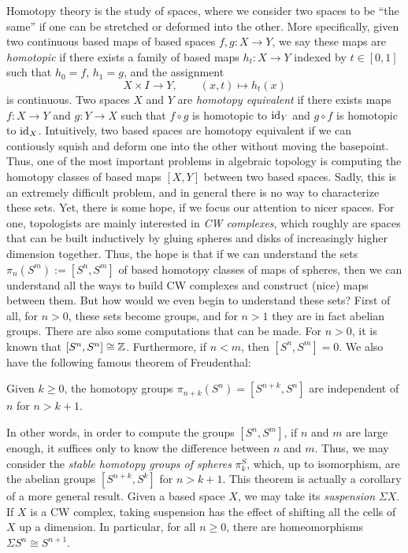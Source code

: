 \documentclass[../main.tex]{subfiles}
\begin{document}
Homotopy theory is the study of spaces, where we consider two spaces to be ``the same'' if one can be stretched or deformed into the other. More specifically, given two continuous based maps of based spaces $f,g:X\to Y$, we say these maps are \emph{homotopic} if there exists a family of based maps $h_t:X\to Y$ indexed by $t\in[0,1]$ such that $h_0=f$, $h_1=g$, and the assignment
\[X\times I\to Y,\qquad (x,t)\mapsto h_t(x)\]
is continuous. Two spaces $X$ and $Y$ are \emph{homotopy equivalent} if there exists maps $f:X\to Y$ and $g:Y\to X$ such that $f\circ g$ is homotopic to $\mathrm{id}_Y$ and $g\circ f$ is homotopic to $\mathrm{id}_X$. Intuitively, two based spaces are homotopy equivalent if we can contiously squish and deform one into the other without moving the basepoint. Thus, one of the most important problems in algebraic topology is computing the homotopy classes of based maps $[X,Y]$ between two based spaces. Sadly, this is an extremely difficult problem, and in general there is no way to characterize these sets. Yet, there is some hope, if we focus our attention to nicer spaces. For one, topologists are mainly interested in \emph{CW complexes}, which roughly are spaces that can be built inductively by gluing spheres and disks of increasingly higher dimension together. Thus, the hope is that if we can understand the sets $\pi_n(S^m):=[S^n,S^m]$ of based homotopy classes of maps of spheres, then we can understand all the ways to build CW complexes and construct (nice) maps between them. But how would we even begin to understand these sets? First of all, for $n>0$, these sets become groups, and for $n>1$ they are in fact abelian groups. There are also some computations that can be made. For $n>0$, it is known that $[S^n,S^n]\cong\mathbb{Z}$. Furthermore, if $n<m$, then $[S^n,S^m]=0$. We also have the following famous theorem of Freudenthal:

\begin{theorem}
    Given $k\geq0$, the homotopy groups $\pi_{n+k}(S^n)=[S^{n+k},S^n]$ are independent of $n$ for $n>k+1$.
\end{theorem}

In other words, in order to compute the groups $[S^n,S^m]$, if $n$ and $m$ are large enough, it suffices only to know the difference between $n$ and $m$. Thus, we may consider the \emph{stable homotopy groups of spheres} $\pi^S_k$, which, up to isomorphism, are the abelian groups $[S^{n+k},S^k]$ for $n>k+1$. This theorem is actually a corollary of a more general result. Given a based space $X$, we may take its \emph{suspension} $\Sigma X$. If $X$ is a CW complex, taking suspension has the effect of shifting all the cells of $X$ up a dimension. In particular, for all $n\geq0$, there are homeomorphisms $\Sigma S^n\cong S^{n+1}$.
\end{document}

